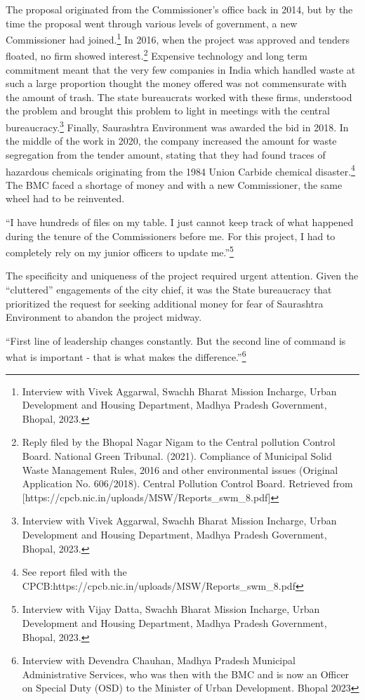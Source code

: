 The proposal originated from the Commissioner's office back in 2014, but by the time the proposal went through various levels of government, a new Commissioner had joined.\footnote{Interview with Vivek Aggarwal, Swachh Bharat Mission Incharge, Urban Development and Housing Department, Madhya Pradesh Government, Bhopal, 2023.} In 2016, when the project was approved and tenders floated, no firm showed interest.\footnote{Reply filed by the Bhopal Nagar Nigam to the Central pollution Control Board. National Green Tribunal. (2021). Compliance of Municipal Solid Waste Management Rules, 2016 and other environmental issues (Original Application No. 606/2018). Central Pollution Control Board. Retrieved from [https://cpcb.nic.in/uploads/MSW/Reports\_swm\_8.pdf]} Expensive technology and long term commitment meant that the very few companies in India which handled waste at such a large proportion thought the money offered was not commensurate with the amount of trash. The state bureaucrats worked with these firms, understood the problem and brought this problem to light in meetings with the central bureaucracy.\footnote{Interview with Vivek Aggarwal, Swachh Bharat Mission Incharge, Urban Development and Housing Department, Madhya Pradesh Government, Bhopal, 2023.} Finally, Saurashtra Environment was awarded the bid in 2018. In the middle of the work in 2020, the company increased the amount for waste segregation from the tender amount, stating that they had found traces of hazardous chemicals originating from the 1984 Union Carbide chemical disaster.\footnote{See report filed with the CPCB:https://cpcb.nic.in/uploads/MSW/Reports\_swm\_8.pdf} The BMC faced a shortage of money and with a new Commissioner, the same wheel had to be reinvented.

``I have hundreds of files on my table. I just cannot keep track of what happened during the tenure of the Commissioners before me. For this project, I had to completely rely on my junior officers to update me.''\footnote{Interview with Vijay Datta, Swachh Bharat Mission Incharge, Urban Development and Housing Department, Madhya Pradesh Government, Bhopal, 2023.}

The specificity and uniqueness of the project required urgent attention. Given the ``cluttered'' engagements of the city chief, it was the State bureaucracy that prioritized the request for seeking additional money for fear of Saurashtra Environment to abandon the project midway.

``First line of leadership changes constantly. But the second line of command is what is important - that is what makes the difference.''\footnote{Interview with Devendra Chauhan, Madhya Pradesh Municipal Administrative Services, who was then with the BMC and is now an Officer on Special Duty (OSD) to the Minister of Urban Development. Bhopal 2023}

